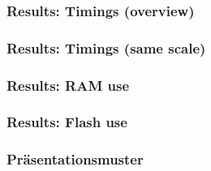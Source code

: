 \begin{frame}[c]
    \centering
    \frametitle{Results: Timings (overview)}
    \resizebox{!}{.35\textheight}{
        
    }
\end{frame}

\begin{frame}[c]
    \centering
    \frametitle{Results: Timings (same scale)}
    \resizebox{!}{.35\textheight}{
        
    }
\end{frame}

\begin{frame}[c]
    \frametitle{Results: RAM use}
    \centering
    
\end{frame}

\begin{frame}
    \frametitle{Results: Flash use}
    \centering
    
\end{frame}



\PraesentationStartseiteFlaggen



\PraesentationTitelseite %


\begin{frame}
\end{frame}

\PraesentationMasterWeissSchwarz

\begin{frame}
    \frametitle{Präsentationsmuster}
\end{frame}



